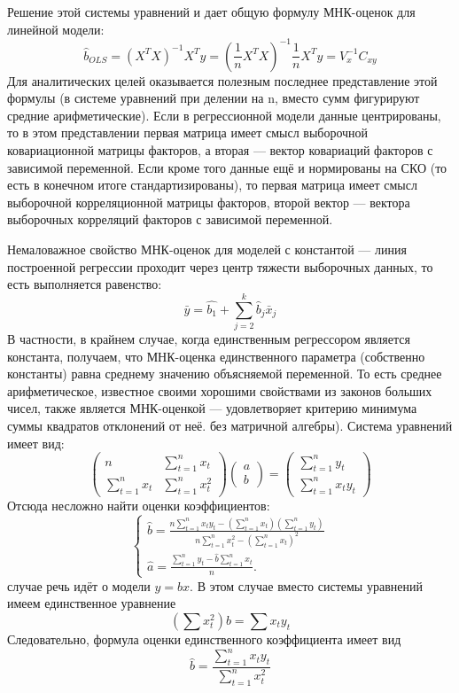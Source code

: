 \documentclass[a4paper, 12pt]{article}
\begin{document}
	Решение этой системы уравнений и дает общую формулу МНК-оценок для линейной модели:
	\begin{equation*}
		\hat{b}_{O L S}=\left(X^{T} X\right)^{-1} X^{T} y=\left(\frac{1}{n} X^{T} X\right)^{-1} \frac{1}{n} X^{T} y=V_{x}^{-1} C_{x y}
	\end{equation*}
	Для аналитических целей оказывается полезным последнее представление этой формулы (в системе уравнений при делении на n, вместо сумм фигурируют средние арифметические). Если в регрессионной модели данные центрированы, то в этом представлении первая матрица имеет смысл выборочной ковариационной матрицы факторов, а вторая — вектор ковариаций факторов с зависимой переменной. Если кроме того данные ещё и нормированы на СКО (то есть в конечном итоге стандартизированы), то первая матрица имеет смысл выборочной корреляционной матрицы факторов, второй вектор — вектора выборочных корреляций факторов с зависимой переменной.
	
	Немаловажное свойство МНК-оценок для моделей с константой — линия построенной регрессии проходит через центр тяжести выборочных данных, то есть выполняется равенство:
	\begin{equation*}
		\bar{y}=\hat{b_{1}}+\sum_{j=2}^{k} \hat{b}_{j} \bar{x}_{j}
	\end{equation*}
	В частности, в крайнем случае, когда единственным регрессором является константа, получаем, что МНК-оценка единственного параметра (собственно константы) равна среднему значению объясняемой переменной. То есть среднее арифметическое, известное своими хорошими свойствами из законов больших чисел, также является МНК-оценкой — удовлетворяет критерию минимума суммы квадратов отклонений от неё.
	без матричной алгебры). Система уравнений имеет вид:
	$$
	\left(\begin{array}{cc}
		n & \sum_{t=1}^{n} x_{t} \\
		\sum_{t=1}^{n} x_{t} & \sum_{t=1}^{n} x_{t}^{2}
	\end{array}\right)\left(\begin{array}{l}
		a \\
		b
	\end{array}\right)=\left(\begin{array}{c}
		\sum_{t=1}^{n} y_{t} \\
		\sum_{t=1}^{n} x_{t} y_{t}
	\end{array}\right)
	$$
	Отсюда несложно найти оценки коэффициентов:
	$$
	\left\{\begin{array}{l}
		\hat{b}=\frac{n \sum_{t=1}^{n} x_{t} y_{t}-\left(\sum_{t=1}^{n} x_{t}\right)\left(\sum_{t=1}^{n} y_{t}\right)}{n \sum_{t=1}^{n} x_{t}^{2}-\left(\sum_{t=1}^{n} x_{t}\right)^{2}} \\
		\hat{a}=\frac{\sum_{t=1}^{n} y_{t}-\hat{b} \sum_{t=1}^{n} x_{t}}{n} .
	\end{array}\right.
	$$
	случае речь идёт о модели $y=b x .$ В этом случае вместо системы уравнений имеем единственное уравнение
	$$
	\left(\sum x_{t}^{2}\right) b=\sum x_{t} y_{t}
	$$
	Следовательно, формула оценки единственного коэффициента имеет вид
	$$
	\hat{b}=\frac{\sum_{t=1}^{n} x_{t} y_{t}}{\sum_{t=1}^{n} x_{t}^{2}}
	$$
	
\end{document}
